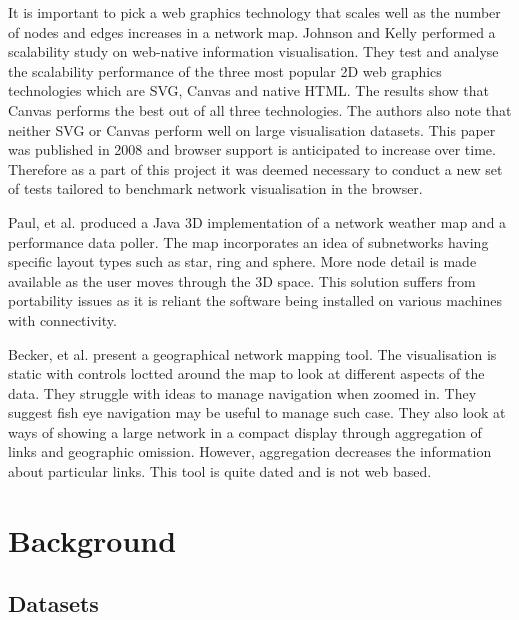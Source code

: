 \documentclass[11pt, a4paper]{article}
\begin{document}
It is important to pick a web graphics technology that scales well as the number
of nodes and edges increases in a network map. Johnson and Kelly performed a
scalability study on web-native information visualisation.\cite{Johnson_2008}
They test and analyse the scalability performance of the three most popular 2D
web graphics technologies which are SVG, Canvas and native HTML. The results
show that Canvas performs the best out of all three technologies. The authors
also note that neither SVG or Canvas perform well on large visualisation
datasets. This paper was published in 2008 and browser support is anticipated to
increase over time. Therefore as a part of this project it was deemed necessary
to conduct a new set of tests tailored to benchmark network visualisation in the
browser.


Paul, et al. produced a Java 3D implementation of a network weather map and a
performance data poller.\cite{Paul_2000} The map incorporates an idea of
subnetworks having specific layout types such as star, ring and sphere. More
node detail is made available as the user moves through the 3D space. This
solution suffers from portability issues as it is reliant the software being
installed on various machines with connectivity.

Becker, et al. present a geographical network mapping tool.\cite{Becker_1995}
The visualisation is static with controls loctted around the map to look at
different aspects of the data. They struggle with ideas to manage navigation
when zoomed in. They suggest fish eye navigation may be useful to manage such
case. They also look at ways of showing a large network in a compact display
through aggregation of links and geographic omission. However, aggregation
decreases the information about particular links. This tool is quite dated and
is not web based.



\section{Background}
\label{sec:background}

\subsection{Datasets}
\label{sec:datasets}
\end{document}

